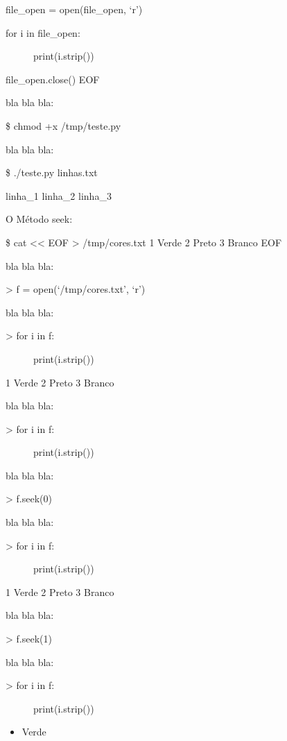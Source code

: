 \documentclass[letterpaper,10pt,brazil]{sphinxmanual}
\begin{document}
file\_open = open(file\_open, ‘r’)
\begin{description}
\item[{for i in file\_open:}] \leavevmode
print(i.strip())

\end{description}

file\_open.close()
EOF

bla bla bla:

\$ chmod +x /tmp/teste.py

bla bla bla:

\$ ./teste.py linhas.txt

linha\_1
linha\_2
linha\_3

O Método seek:

\$ cat \textless{}\textless{} EOF \textgreater{} /tmp/cores.txt
1 \sphinxhyphen{} Verde
2 \sphinxhyphen{} Preto
3 \sphinxhyphen{} Branco
EOF

bla bla bla:

\textgreater{} f = open(‘/tmp/cores.txt’, ‘r’)

bla bla bla:
\begin{description}
\item[{\textgreater{} for i in f:}] \leavevmode
print(i.strip())

\end{description}

1 \sphinxhyphen{} Verde
2 \sphinxhyphen{} Preto
3 \sphinxhyphen{} Branco

bla bla bla:
\begin{description}
\item[{\textgreater{} for i in f:}] \leavevmode
print(i.strip())

\end{description}

bla bla bla:

\textgreater{} f.seek(0)

bla bla bla:
\begin{description}
\item[{\textgreater{} for i in f:}] \leavevmode
print(i.strip())

\end{description}

1 \sphinxhyphen{} Verde
2 \sphinxhyphen{} Preto
3 \sphinxhyphen{} Branco

bla bla bla:

\textgreater{} f.seek(1)

bla bla bla:
\begin{description}
\item[{\textgreater{} for i in f:}] \leavevmode
print(i.strip())

\end{description}
\begin{itemize}
\item {} 
Verde

\end{itemize}
\end{document}
